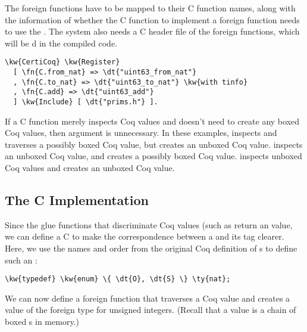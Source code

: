 The \gls{foreign function}s have to be mapped to their C function names, along with the information of whether the C function to implement a \gls{foreign function} needs to use the . The system also needs a C header file of the \gls{foreign function}s, which will be d in the compiled code.\newpage

\begin{Verbatim}
\kw{CertiCoq} \kw{Register}
  [ \fn{C.from_nat} => \dt{"uint63_from_nat"}
  , \fn{C.to_nat} => \dt{"uint63_to_nat"} \kw{with tinfo}
  , \fn{C.add} => \dt{"uint63_add"}
  ] \kw{Include} [ \dt{"prims.h"} ].
\end{Verbatim}

If a C function merely inspects Coq values and doesn't need to create any \gls{boxed} Coq values, then  argument is unnecessary. In these examples,  inspects and traverses a possibly \gls{boxed} Coq value, but creates an \gls{unboxed} Coq value.  inspects an \gls{unboxed} Coq value, and creates a possibly \gls{boxed} Coq value.  inspects \gls{unboxed} Coq values and creates an \gls{unboxed} Coq value.

\subsection{The C Implementation}

Since the glue functions that discriminate Coq values (such as  return an  value, we can define a C  to make the correspondence between a \constructor{} and its \gls{tag} clearer. Here, we use the \constructor{} names and order from the original Coq definition of s to define such an :

\begin{Verbatim}
\kw{typedef} \kw{enum} \{ \dt{O}, \dt{S} \} \ty{nat};
\end{Verbatim}

We can now define a \gls{foreign function}  that traverses a Coq  value and creates a value of the \gls{foreign type} for unsigned integers. (Recall that a  value is a chain of \gls{boxed}  \constructor{}s in memory.)

